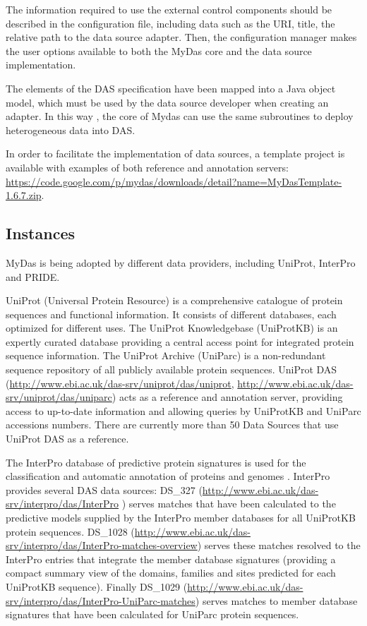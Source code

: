 The information required to use the external control components should be described in the configuration file, including data such as the URI, title, the relative path to the data source adapter. Then, the configuration manager makes the user options available to both the MyDas core and the data source implementation. 

The elements of the DAS specification have been mapped into a Java object model, which must be used by the data source developer when creating an adapter. In this way , the core of Mydas can use the same subroutines to deploy heterogeneous data into DAS. 

In order to facilitate the implementation of data sources, a template project is available with examples of both reference and annotation servers: \url{https://code.google.com/p/mydas/downloads/detail?name=MyDasTemplate-1.6.7.zip}.

\subsection{Instances}
MyDas is being adopted by different data providers, including UniProt, InterPro and PRIDE.

UniProt (Universal Protein Resource)\cite{UNI2011} is a comprehensive catalogue of protein sequences and functional information. It consists of different databases, each optimized for different uses. The UniProt Knowledgebase (UniProtKB) is an expertly curated database providing a central access point for integrated protein sequence information. The UniProt Archive (UniParc) is a non-redundant sequence repository of all publicly available protein sequences. UniProt DAS (\url{http://www.ebi.ac.uk/das-srv/uniprot/das/uniprot}, \url{http://www.ebi.ac.uk/das-srv/uniprot/das/uniparc}) acts as a reference and annotation server, providing access to up-to-date information and allowing queries by UniProtKB and UniParc accessions numbers. There are currently more than 50 Data Sources that use UniProt DAS as a reference.

The InterPro database of predictive protein signatures is used for the classification and automatic annotation of proteins and genomes \cite{HUN2009}. InterPro provides several DAS data sources: DS\_327 (\url{http://www.ebi.ac.uk/das-srv/interpro/das/InterPro} ) serves matches that have been calculated to the predictive models supplied by the InterPro member databases for all UniProtKB protein sequences.  DS\_1028 (\url{http://www.ebi.ac.uk/das-srv/interpro/das/InterPro-matches-overview}) serves these matches resolved to the InterPro entries that integrate the member database signatures (providing a compact summary view of the domains, families and sites predicted for each UniProtKB sequence). Finally DS\_1029 (\url{http://www.ebi.ac.uk/das-srv/interpro/das/InterPro-UniParc-matches}) serves matches to member database signatures that have been calculated for UniParc protein sequences.

